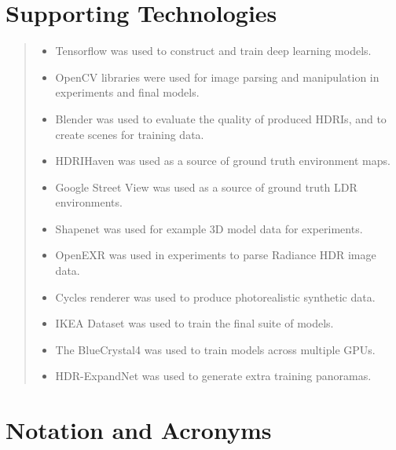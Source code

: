 \documentclass[ %
                    author={Gavin Parker},
                supervisor={Dr. Neill Campbell},
                    degree={MEng},
                     title={Deep Siamese Networks for Illumination Estimation from Stereo Images},
                  subtitle={},
                      type={research},
                      year={2018} ]{dissertation}
\begin{document}



\chapter*{Supporting Technologies}

\vspace{1cm} 
\begin{quote}
\noindent
\begin{itemize}
\item Tensorflow was used to construct and train deep learning models.
\item OpenCV libraries were used for image parsing and manipulation in experiments and final models.
\item Blender was used to evaluate the quality of produced HDRIs, and to create scenes for training data.
\item HDRIHaven was used as a source of ground truth environment maps.
\item Google Street View was used as a source of ground truth LDR environments.
\item Shapenet was used for example 3D model data for experiments.
\item OpenEXR was used in experiments to parse Radiance HDR image data.
\item Cycles renderer was used to produce photorealistic synthetic data.
\item IKEA Dataset was used to train the final suite of models.
\item The BlueCrystal4 was used to train models across multiple GPUs.
\item HDR-ExpandNet was used to generate extra training panoramas.
\end{itemize}
\end{quote}


\chapter*{Notation and Acronyms}
\end{document}

